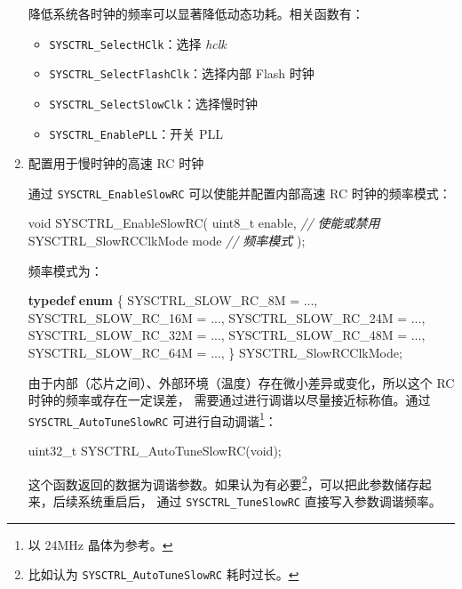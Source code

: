 \documentclass[
  12pt,
]{book}
\newenvironment{Shaded}{\begin{snugshade}}{\end{snugshade}}
\newcommand{\CommentTok}[1]{\textcolor[rgb]{0.56,0.35,0.01}{\textit{#1}}}
\newcommand{\DataTypeTok}[1]{\textcolor[rgb]{0.13,0.29,0.53}{#1}}
\newcommand{\KeywordTok}[1]{\textcolor[rgb]{0.13,0.29,0.53}{\textbf{#1}}}
\newcommand{\NormalTok}[1]{#1}
\providecommand{\tightlist}{%
  \setlength{\itemsep}{0pt}\setlength{\parskip}{0pt}}
\begin{document}
\begin{enumerate}
  降低系统各时钟的频率可以显著降低动态功耗。相关函数有：

  \begin{itemize}
  \tightlist
  \item
    \texttt{SYSCTRL\_SelectHClk}：选择 \emph{hclk}
  \item
    \texttt{SYSCTRL\_SelectFlashClk}：选择内部 Flash 时钟
  \item
    \texttt{SYSCTRL\_SelectSlowClk}：选择慢时钟
  \item
    \texttt{SYSCTRL\_EnablePLL}：开关 PLL
  \end{itemize}
\item
  配置用于慢时钟的高速 RC 时钟

  通过 \texttt{SYSCTRL\_EnableSlowRC} 可以使能并配置内部高速 RC 时钟的频率模式：

\begin{Shaded}
\begin{Highlighting}[]
\DataTypeTok{void}\NormalTok{ SYSCTRL_EnableSlowRC(}
    \DataTypeTok{uint8_t}\NormalTok{ enable,             }\CommentTok{// 使能或禁用}
\NormalTok{    SYSCTRL_SlowRCClkMode mode  }\CommentTok{// 频率模式}
\NormalTok{);}
\end{Highlighting}
\end{Shaded}

  频率模式为：

\begin{Shaded}
\begin{Highlighting}[]
\KeywordTok{typedef} \KeywordTok{enum}
\NormalTok{\{}
\NormalTok{    SYSCTRL_SLOW_RC_8M = ...,}
\NormalTok{    SYSCTRL_SLOW_RC_16M = ...,}
\NormalTok{    SYSCTRL_SLOW_RC_24M = ...,}
\NormalTok{    SYSCTRL_SLOW_RC_32M = ...,}
\NormalTok{    SYSCTRL_SLOW_RC_48M = ...,}
\NormalTok{    SYSCTRL_SLOW_RC_64M = ...,}
\NormalTok{\} SYSCTRL_SlowRCClkMode;}
\end{Highlighting}
\end{Shaded}

  由于内部（芯片之间）、外部环境（温度）存在微小差异或变化，所以这个 RC 时钟的频率或存在一定误差，
  需要通过进行调谐以尽量接近标称值。通过 \texttt{SYSCTRL\_AutoTuneSlowRC} 可进行自动调谐\footnote{以 24MHz 晶体为参考。}：

\begin{Shaded}
\begin{Highlighting}[]
\DataTypeTok{uint32_t}\NormalTok{ SYSCTRL_AutoTuneSlowRC(}\DataTypeTok{void}\NormalTok{);}
\end{Highlighting}
\end{Shaded}

  这个函数返回的数据为调谐参数。如果认为有必要\footnote{比如认为 \texttt{SYSCTRL\_AutoTuneSlowRC} 耗时过长。}，可以把此参数储存起来，后续系统重启后，
  通过 \texttt{SYSCTRL\_TuneSlowRC} 直接写入参数调谐频率。
\end{enumerate}
\end{document}
